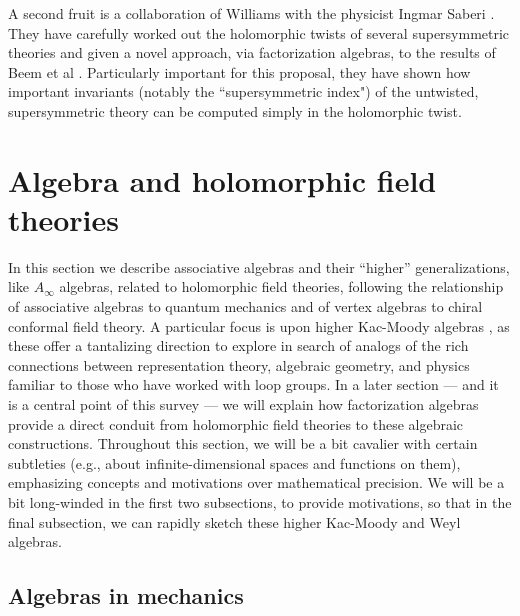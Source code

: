 \documentclass[11pt]{amsart}
\begin{document}
A second fruit is a collaboration of Williams with the physicist Ingmar Saberi \cite{SabWil1,SabWil2}.
They have carefully worked out the holomorphic twists of several supersymmetric theories
and given a novel approach, via factorization algebras, to the results of Beem et al \cite{Beem}.
Particularly important for this proposal,
they have shown how important invariants (notably the ``supersymmetric index") of the untwisted, supersymmetric theory can be computed simply in the holomorphic twist.



\section{Algebra and holomorphic field theories}

In this section we describe  associative algebras and their ``higher'' generalizations, like $A_\infty$ algebras, related to holomorphic field theories,
following the relationship of associative algebras to quantum mechanics and of vertex algebras to chiral conformal field theory.
A particular focus is upon higher Kac-Moody algebras \cite{FHK},
as these offer a tantalizing direction to explore in search of analogs of the rich connections between representation theory, algebraic geometry, and physics familiar to those who have worked with loop groups.
In a later section --- and it is a central point of this survey --- we will explain how factorization algebras provide a direct conduit from holomorphic field theories to these algebraic constructions.
Throughout this section, we will be a bit cavalier with certain subtleties (e.g., about infinite-dimensional spaces and functions on them), 
emphasizing concepts and motivations over mathematical precision.
We will be a bit long-winded in the first two subsections, to provide motivations,
so that in the final subsection, we can rapidly sketch these higher Kac-Moody and Weyl algebras.

\subsection{Algebras in mechanics}
\end{document}
